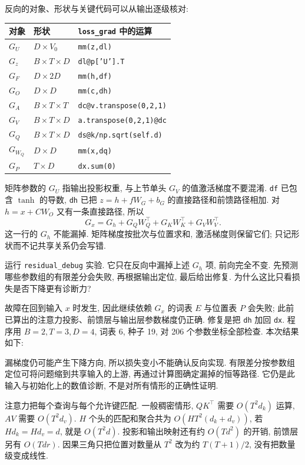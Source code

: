 反向的对象、形状与关键代码可以从输出逐级核对:
\begin{center}
\begin{tabular}{lll}\toprule
对象 & 形状 & \texttt{loss\_grad} 中的运算 \\\midrule
$G_U$ & $D\times V_0$ & \texttt{mm(z,dl)} \\
$G_z$ & $B\times T\times D$ & \texttt{dl@p['U'].T} \\
$G_F$ & $D\times 2D$ & \texttt{mm(h,df)} \\
$G_O$ & $D\times D$ & \texttt{mm(c,dh)} \\
$G_A$ & $B\times T\times T$ & \texttt{dc@v.transpose(0,2,1)} \\
$G_V$ & $B\times T\times D$ & \texttt{a.transpose(0,2,1)@dc} \\
$G_Q$ & $B\times T\times D$ & \texttt{ds@k/np.sqrt(self.d)} \\
$G_{W_Q}$ & $D\times D$ & \texttt{mm(x,dq)} \\
$G_P$ & $T\times D$ & \texttt{dx.sum(0)} \\\bottomrule
\end{tabular}
\end{center}
矩阵参数的 $G_U$ 指输出投影权重, 与上节单头 $G_V$ 的值激活梯度不要混淆. \texttt{df} 已包含 $\tanh$ 的导数, \texttt{dh} 已把 $z=h+fW_G+b_G$ 的直接路径和前馈路径相加. 对 $h=x+CW_O$ 又有一条直接路径, 所以
\[
G_x=G_h+G_QW_Q^\top+G_KW_K^\top+G_VW_V^\top.
\]
这一行的 $G_h$ 不能漏掉. 矩阵梯度按批次与位置求和, 激活梯度则保留它们; 只记形状而不记共享关系仍会写错.

\begin{exercise}
运行 \texttt{residual\_debug} 实验. 它只在反向中漏掉上述 $G_h$ 项, 前向完全不变. 先预测哪些参数组的有限差分会失败, 再根据输出定位, 最后给出修复. 为什么这比只看损失是否下降更有诊断力?
\end{exercise}
\begin{solution}
故障在回到输入 $x$ 时发生, 因此继续依赖 $G_x$ 的词表 $E$ 与位置表 $P$ 会失败; 此前已算出的注意力投影、前馈层与输出层参数梯度仍正确. 修复是把 \texttt{dh} 加回 \texttt{dx}. 程序用 $B=2,T=3,D=4$, 词表 6, 种子 19, 对 206 个参数坐标全部检查. 本次结果如下:

漏梯度仍可能产生下降方向, 所以损失变小不能确认反向实现. 有限差分按参数组定位可将问题缩到共享输入的上游, 再通过计算图确定漏掉的恒等路径. 它仍是此输入与初始化上的数值诊断, 不是对所有情形的正确性证明.
\end{solution}

注意力把每个查询与每个允许键匹配. 一般稠密情形, $QK^\top$ 需要 $O(T^2d_k)$ 运算, $AV$ 需要 $O(T^2d_v)$. $H$ 个头的匹配和聚合共为 $O(HT^2(d_k+d_v))$, 若 $Hd_k=Hd_v=d$, 就是 $O(T^2d)$. 投影和输出映射还有约 $O(Td^2)$ 的开销, 前馈层另有 $O(Tdr)$. 因果三角只把位置对数量从 $T^2$ 改为约 $T(T+1)/2$, 没有把数量级变成线性.

